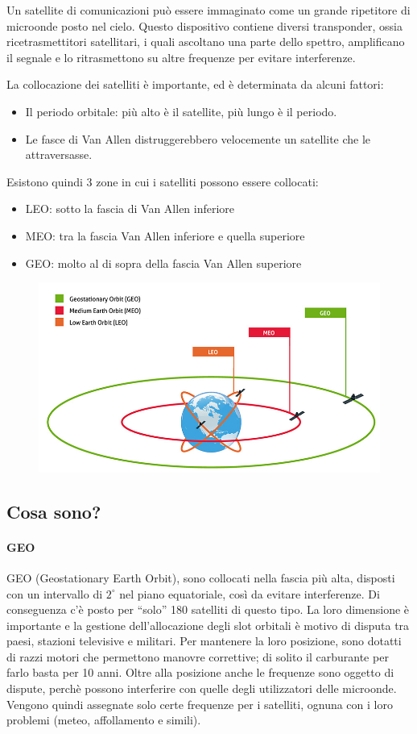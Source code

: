 Un satellite di comunicazioni può essere immaginato come un grande ripetitore di microonde posto nel cielo.
Questo dispositivo contiene diversi transponder, ossia ricetrasmettitori satellitari, i quali ascoltano una parte dello spettro, amplificano il segnale e lo ritrasmettono su altre frequenze per evitare interferenze.

La collocazione dei satelliti è importante, ed è determinata da alcuni fattori:
\begin{itemize}
\item	Il periodo orbitale: più alto è il satellite, più lungo è il periodo.
\item	Le fasce di Van Allen distruggerebbero velocemente un satellite che le attraversasse.
\end{itemize}
Esistono quindi 3 zone in cui i satelliti possono essere collocati:
\begin{itemize}
\item LEO: sotto la fascia di Van Allen inferiore
\item MEO: tra la fascia Van Allen inferiore e quella superiore
\item GEO: molto al di sopra della fascia Van Allen superiore
\end{itemize}

\begin{figure}[H]
\centering
\includegraphics[scale=0.55]{res/img/4_satelliti.png}
\end{figure}
\subsection{Cosa sono?}
\paragraph{GEO}
GEO (Geostationary Earth Orbit), sono collocati nella fascia più alta, disposti con un intervallo di $2^{\circ}$ nel piano equatoriale,
così da evitare interferenze. Di conseguenza c’è posto per “solo” 180 satelliti di questo tipo.
La loro dimensione è importante e la gestione dell’allocazione degli slot orbitali è motivo di disputa tra paesi, stazioni televisive e militari.
Per mantenere la loro posizione, sono dotatti di razzi motori che permettono manovre correttive; di solito il carburante per farlo basta per 10 anni.
Oltre alla posizione anche le frequenze sono oggetto di dispute, perchè possono interferire con quelle degli utilizzatori delle microonde.
Vengono quindi assegnate solo certe frequenze per i satelliti, ognuna con i loro problemi (meteo, affollamento e simili).

